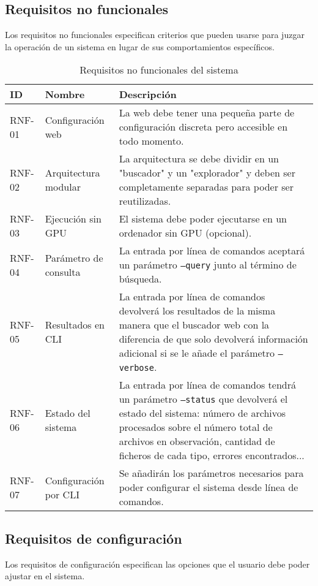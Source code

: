 \subsection{Requisitos no funcionales}
Los requisitos no funcionales especifican criterios que pueden usarse para juzgar la operación de un sistema en lugar de sus comportamientos específicos.

\begin{table}[H]
\centering
\begin{tabular}{|p{1cm}|p{4cm}|p{9cm}|}
\hline
\textbf{ID} & \textbf{Nombre} & \textbf{Descripción} \\
\hline
RNF-01 & Configuración web & La web debe tener una pequeña parte de configuración discreta pero accesible en todo momento. \\
\hline
RNF-02 & Arquitectura modular & La arquitectura se debe dividir en un "buscador" y un "explorador" y deben ser completamente separadas para poder ser reutilizadas. \\
\hline
RNF-03 & Ejecución sin GPU & El sistema debe poder ejecutarse en un ordenador sin GPU (opcional). \\
\hline
RNF-04 & Parámetro de consulta & La entrada por línea de comandos aceptará un parámetro \texttt{--query} junto al término de búsqueda. \\
\hline
RNF-05 & Resultados en CLI & La entrada por línea de comandos devolverá los resultados de la misma manera que el buscador web con la diferencia de que solo devolverá información adicional si se le añade el parámetro \texttt{--verbose}. \\
\hline
RNF-06 & Estado del sistema & La entrada por línea de comandos tendrá un parámetro \texttt{--status} que devolverá el estado del sistema: número de archivos procesados sobre el número total de archivos en observación, cantidad de ficheros de cada tipo, errores encontrados... \\
\hline
RNF-07 & Configuración por CLI & Se añadirán los parámetros necesarios para poder configurar el sistema desde línea de comandos. \\
\hline
\end{tabular}
\caption{Requisitos no funcionales del sistema}
\label{tab:req_no_funcionales}
\end{table}

\subsection{Requisitos de configuración}
Los requisitos de configuración especifican las opciones que el usuario debe poder ajustar en el sistema.

